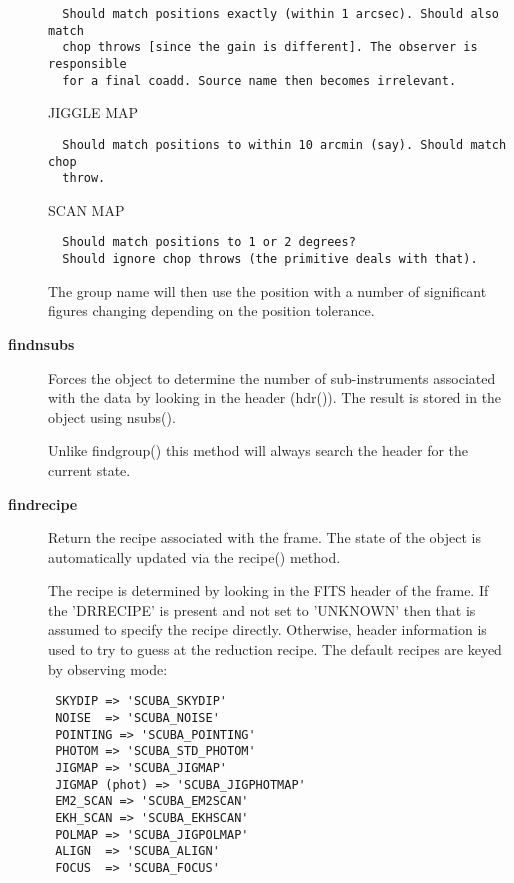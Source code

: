 \begin{description}
\begin{verbatim}
  Should match positions exactly (within 1 arcsec). Should also match
  chop throws [since the gain is different]. The observer is responsible
  for a final coadd. Source name then becomes irrelevant.
\end{verbatim}


JIGGLE MAP

\begin{verbatim}
  Should match positions to within 10 arcmin (say). Should match chop
  throw.
\end{verbatim}


SCAN MAP

\begin{verbatim}
  Should match positions to 1 or 2 degrees?
  Should ignore chop throws (the primitive deals with that).
\end{verbatim}


The group name will then use the position with a number of significant
figures changing depending on the position tolerance.

\item[\textbf{findnsubs}] \mbox{}

Forces the object to determine the number of sub-instruments
associated with the data by looking in the header (hdr()). 
The result is stored in the object using nsubs().



Unlike findgroup() this method will always search the header for
the current state.

\item[\textbf{findrecipe}] \mbox{}

Return the recipe associated with the frame.
The state of the object is automatically updated via the
recipe() method.



The recipe is determined by looking in the FITS header
of the frame. If the 'DRRECIPE' is present and not
set to 'UNKNOWN' then that is assumed to specify the recipe
directly. Otherwise, header information is used to try
to guess at the reduction recipe. The default recipes
are keyed by observing mode:

\begin{verbatim}
 SKYDIP => 'SCUBA_SKYDIP'
 NOISE  => 'SCUBA_NOISE'
 POINTING => 'SCUBA_POINTING'
 PHOTOM => 'SCUBA_STD_PHOTOM'
 JIGMAP => 'SCUBA_JIGMAP'
 JIGMAP (phot) => 'SCUBA_JIGPHOTMAP'
 EM2_SCAN => 'SCUBA_EM2SCAN'
 EKH_SCAN => 'SCUBA_EKHSCAN'
 POLMAP => 'SCUBA_JIGPOLMAP'
 ALIGN  => 'SCUBA_ALIGN'
 FOCUS  => 'SCUBA_FOCUS'
\end{verbatim}



\end{description}
